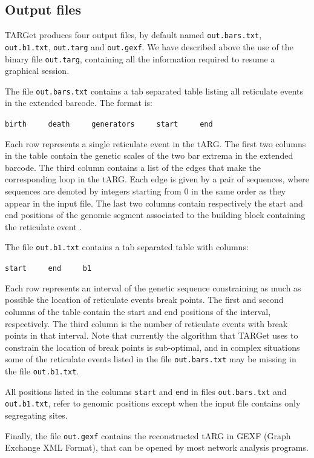 \documentclass[12pt]{article}
\begin{document}
\subsection*{Output files}

TARGet produces four output files, by default named \texttt{out.bars.txt}, \texttt{out.b1.txt}, \texttt{out.targ} and \texttt{out.gexf}. We have described above the use of the binary file \texttt{out.targ}, containing all the information required to resume a graphical session.

The file \texttt{out.bars.txt} contains a tab separated table listing all reticulate events in the extended barcode. The format is:

\texttt{birth\ \ \ \ \ death\ \ \ \ \ generators\ \ \ \ \ start\ \ \ \ \ end}

\noindent Each row represents a single reticulate event in the tARG. The first two columns in the table contain the genetic scales of the two bar extrema in the extended barcode. The third column contains a list of the edges that make the corresponding loop in the tARG. Each edge is given by a pair of sequences, where sequences are denoted by integers starting from 0 in the same order as they appear in the input file. The last two columns contain respectively the start and end positions of the genomic segment associated to the building block containing the reticulate event \cite{target}. 

The file \texttt{out.b1.txt} contains a tab separated table with columns:

\texttt{start\ \ \ \ \ end\ \ \ \ \ b1}

\noindent Each row represents an interval of the genetic sequence constraining as much as possible the location of reticulate events break points. The first and second columns of the table contain the start and end positions of the interval, respectively. The third column is the number of reticulate events with break points in that interval. Note that currently the algorithm that TARGet uses to constrain the location of break points is sub-optimal, and in complex situations some of the reticulate events listed in the file \texttt{out.bars.txt} may be missing in the file \texttt{out.b1.txt}.

All positions listed in the columns \texttt{start} and \texttt{end} in files \texttt{out.bars.txt} and \texttt{out.b1.txt}, refer to genomic positions except when the input file contains only segregating sites.

Finally, the file \texttt{out.gexf} contains the reconstructed tARG in GEXF (Graph Exchange XML Format), that can be opened by most network analysis programs.
\end{document}
